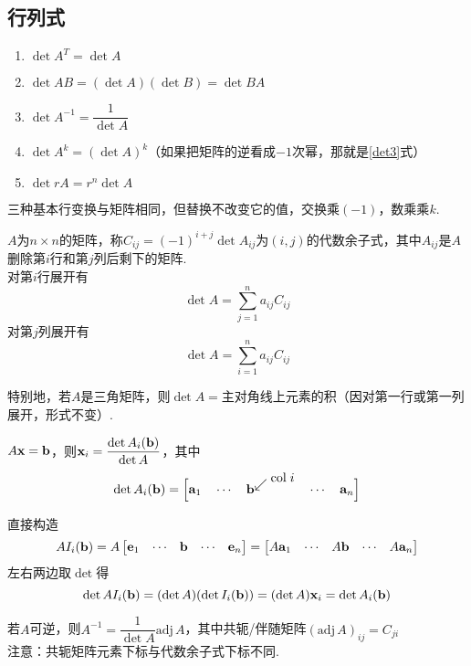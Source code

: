\subsection{行列式}
\begin{proposition}[行列式的基本运算]\mbox{}\par
\begin{enumerate}
	\itemsep -1pt
	\item $\det A^T=\det A$
	\item $\det AB=(\det A)(\det B)=\det BA$
	\item \label{det3}$\det A^{-1}=\dfrac{1}{\det A}$
	\item $\det A^k=(\det A)^k$（如果把矩阵的逆看成$-1$次幂，那就是\ref{det3}式）
	\item $\det rA=r^n\det A$
\end{enumerate}
\end{proposition}
\begin{proposition}[行列式基本行变换]
三种基本行变换与矩阵相同，但替换不改变它的值，交换乘$(-1)$，数乘乘$k$.
\end{proposition}
\begin{theorem}
$A$为$n\times n$的矩阵，称$C_{ij}=(-1)^{i+j}\det A_{ij}$为$(i,j)$的代数余子式，其中$A_{ij}$是$A$删除第$i$行和第$j$列后剩下的矩阵.\\
对第$i$行展开有
\[\det A=\sum_{j=1}^{n}a_{ij}C_{ij}\]
对第$j$列展开有
\[\det A=\sum_{i=1}^{n}a_{ij}C_{ij}\]
\end{theorem}
特别地，若$A$是三角矩阵，则$\det A=$主对角线上元素的积（因对第一行或第一列展开，形式不变）.
\begin{theorem}
$A\mathbf{x}=\mathbf{b}$，则$\mathbf{x}_i=\dfrac{\det A_i(\mathbf{b})}{\det A}$，其中\[\det A_i(\vb{b})=\Big[\vb{a}_1\quad\cdots\quad\vb{b}^{\disp\swarrow\raisebox{0.5em}{$\mathrm{col}\;i$}}\quad\cdots\quad\vb{a}_n\Big]\]
\end{theorem}
\begin{analysis}直接构造
\[AI_i(\mathbf{b})=A\begin{bmatrix}\mathbf{e}_1&\cdots&\mathbf{b}&\cdots&\mathbf{e}_n\end{bmatrix}=\begin{bmatrix}A\mathbf{a}_1&\cdots& A\mathbf{b}&\cdots& A\mathbf{a}_n\end{bmatrix}\]
左右两边取$\det$得
\[\det AI_i(\mathbf{b})=(\det A)(\det I_i(\mathbf{b}))=(\det A)\mathbf{x}_i=\det A_i(\mathbf{b})\]
\end{analysis}
\begin{theorem}
若$A$可逆，则$A^{-1}=\dfrac{1}{\det A}\mathrm{adj}\,A$，其中共轭/伴随矩阵$(\mathrm{adj}\,A)_{ij}=C_{ji}$\\
注意：共轭矩阵元素下标与代数余子式下标不同.
\end{theorem}
